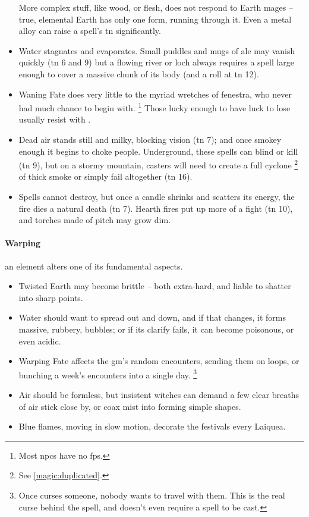 \begin{multicols}{2}
\begin{itemize}
  More complex stuff, like wood, or flesh, does not respond to Earth mages -- true, elemental Earth has only one form, running through it.
  Even a metal alloy can raise a spell's \gls{tn} significantly.
  \item
  Water stagnates and evaporates.
  Small puddles and mugs of ale may vanish quickly (\gls{tn} 6 and 9)
  but a flowing river or loch always requires a spell large enough to cover a massive chunk of its body (and a roll at \gls{tn} 12).
  \item
  Waning Fate does very little to the myriad wretches of \gls{fenestra}, who never had much chance to begin with.%
  \footnote{Most \glspl{npc} have no \glspl{fp}.}
  Those lucky enough to have luck to lose usually resist with .
  \item
  Dead air stands still and milky, blocking vision (\gls{tn} 7);
  and once smokey enough it begins to choke people.
  Underground, these spells can blind or kill (\gls{tn} 9), but on a stormy mountain, casters will need to create a full cyclone%
  \footnote{See \vref{magic:duplicated}.}
  of thick smoke or simply fail altogether (\gls{tn} 16).
  \item
  Spells cannot destroy, but once a candle shrinks and scatters its energy, the fire dies a natural death (\gls{tn} 7).
  Hearth fires put up more of a fight (\gls{tn} 10), and torches made of pitch may grow dim.
\end{itemize}

\paragraph{Warping}
an element alters one of its fundamental aspects.

\begin{itemize}
  \item
  Twisted Earth may become brittle -- both extra-hard, and liable to shatter into sharp points.
  \item
  Water should want to spread out and down, and if that changes, it forms massive, rubbery, bubbles;
  or if its clarify fails, it can become poisonous, or even acidic.
  \item
  Warping Fate affects the \gls{gm}'s random encounters, sending them on loops, or bunching a week's encounters into a single day.%
  \footnote{Once  curses someone, nobody wants to travel with them.  This is the real curse behind the spell, and doesn't even require a spell to be cast.}
  \item
  Air should be formless, but insistent witches can demand a few clear breaths of air stick close by, or coax mist into forming simple shapes.
  \item
  Blue flames, moving in slow motion, decorate the festivals every \gls{Laiquea}.
\end{itemize}


\end{multicols}
